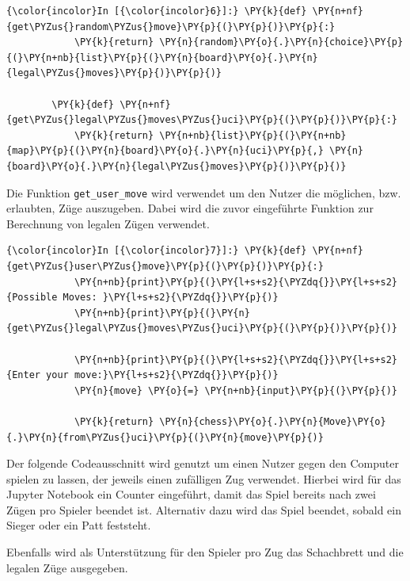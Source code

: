     \begin{Verbatim}[commandchars=\\\{\}]
{\color{incolor}In [{\color{incolor}6}]:} \PY{k}{def} \PY{n+nf}{get\PYZus{}random\PYZus{}move}\PY{p}{(}\PY{p}{)}\PY{p}{:}
            \PY{k}{return} \PY{n}{random}\PY{o}{.}\PY{n}{choice}\PY{p}{(}\PY{n+nb}{list}\PY{p}{(}\PY{n}{board}\PY{o}{.}\PY{n}{legal\PYZus{}moves}\PY{p}{)}\PY{p}{)}
        
        \PY{k}{def} \PY{n+nf}{get\PYZus{}legal\PYZus{}moves\PYZus{}uci}\PY{p}{(}\PY{p}{)}\PY{p}{:}
            \PY{k}{return} \PY{n+nb}{list}\PY{p}{(}\PY{n+nb}{map}\PY{p}{(}\PY{n}{board}\PY{o}{.}\PY{n}{uci}\PY{p}{,} \PY{n}{board}\PY{o}{.}\PY{n}{legal\PYZus{}moves}\PY{p}{)}\PY{p}{)}
\end{Verbatim}


    Die Funktion \texttt{get\_user\_move} wird verwendet um den Nutzer die
möglichen, bzw. erlaubten, Züge auszugeben. Dabei wird die zuvor
eingeführte Funktion zur Berechnung von legalen Zügen verwendet.

    \begin{Verbatim}[commandchars=\\\{\}]
{\color{incolor}In [{\color{incolor}7}]:} \PY{k}{def} \PY{n+nf}{get\PYZus{}user\PYZus{}move}\PY{p}{(}\PY{p}{)}\PY{p}{:}
            \PY{n+nb}{print}\PY{p}{(}\PY{l+s+s2}{\PYZdq{}}\PY{l+s+s2}{Possible Moves: }\PY{l+s+s2}{\PYZdq{}}\PY{p}{)}
            \PY{n+nb}{print}\PY{p}{(}\PY{n}{get\PYZus{}legal\PYZus{}moves\PYZus{}uci}\PY{p}{(}\PY{p}{)}\PY{p}{)}
            
            \PY{n+nb}{print}\PY{p}{(}\PY{l+s+s2}{\PYZdq{}}\PY{l+s+s2}{Enter your move:}\PY{l+s+s2}{\PYZdq{}}\PY{p}{)}
            \PY{n}{move} \PY{o}{=} \PY{n+nb}{input}\PY{p}{(}\PY{p}{)}
                
            \PY{k}{return} \PY{n}{chess}\PY{o}{.}\PY{n}{Move}\PY{o}{.}\PY{n}{from\PYZus{}uci}\PY{p}{(}\PY{n}{move}\PY{p}{)}
\end{Verbatim}


    Der folgende Codeausschnitt wird genutzt um einen Nutzer gegen den
Computer spielen zu lassen, der jeweils einen zufälligen Zug verwendet.
Hierbei wird für das Jupyter Notebook ein Counter eingeführt, damit das
Spiel bereits nach zwei Zügen pro Spieler beendet ist. Alternativ dazu
wird das Spiel beendet, sobald ein Sieger oder ein Patt feststeht.

Ebenfalls wird als Unterstützung für den Spieler pro Zug das Schachbrett
und die legalen Züge ausgegeben.

